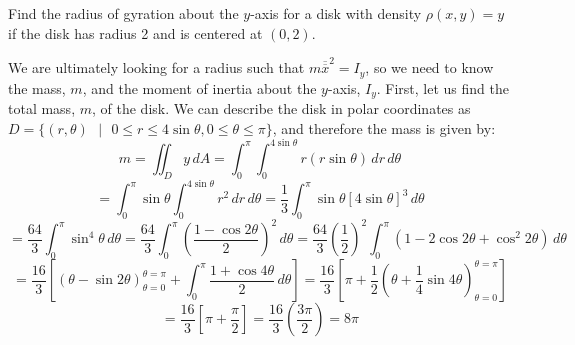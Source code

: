 \begin{Worked}
\begin{Problem}
Find the radius of gyration about the $y$-axis for a disk
with density $\rho(x, y) = y$ if the disk has radius 2 and is centered at $(0, 
2)$. 
\end{Problem}
\begin{Solution}
We are ultimately looking for a radius such that $m
\overline{\overline{x}}^2 = I_y$, so we need to know the mass, $m$, and the 
moment of inertia about the $y$-axis, $I_y$. First, let us find the total mass, 
$m$, of the disk. We can describe the disk in polar coordinates as $\textit{D} 
= \{(r, \theta)\text{ }|\text{ }0 \leq r \leq 4\sin{\theta}, 0 \leq \theta 
\leq \pi\}$, and therefore the mass is given by:
$$m = \iint_{\textit{D}} y \,dA = \int_0^{\pi} \int_0^{4\sin{\theta}} r \left(r
\sin{\theta} \right)\,dr \,d\theta$$
$$= \int_0^{\pi} \sin{\theta} \int_0^{4\sin{\theta}} r^2\,dr\,d\theta = \frac{1
}{3} \int_0^{\pi} \sin{\theta} \left[ 4\sin{\theta} \right]^3\,d\theta$$
$$= \frac{64}{3} \int_0^{\pi} \sin^4{\theta}\,d\theta = \frac{64}{3} \int_0^{
\pi} \left( \frac{1 - \cos{2\theta}}{2} \right)^2\,d\theta = \frac{64}{3} 
\left( \frac{1}{2} \right)^2 \int_0^{\pi} \left( 1 - 2\cos{2\theta} + \cos^2{2
\theta}\right) \,d\theta$$
$$= \frac{16}{3} \left[ \left(\theta - \sin{2\theta} \right)_{\theta = 0}^{
\theta = \pi} + \int_0^{\pi} \frac{1 + \cos{4\theta}}{2} \,d\theta \right] = 
\frac{16}{3} \left[ \pi + \frac{1}{2} \left(\theta + \frac{1}{4}\sin{4\theta} 
\right)_{\theta = 0}^{\theta = \pi} \right]$$
$$= \frac{16}{3} \left[ \pi + \frac{\pi}{2} \right] = \frac{16}{3} \left( 
\frac{3\pi}{2} \right) = 8\pi$$


\end{Solution}
\end{Worked}
